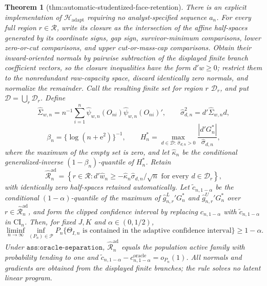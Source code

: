 \documentclass{article}
\newtheorem{theorem}{Theorem}
\begin{document}
\begin{theorem}[thm:automatic-studentized-face-retention]\label{thm:automatic-studentized-face-retention}
There is an explicit implementation of \(\mathcal H_{\mathrm{adapt}}\) requiring no analyst-specified sequence \(a_n\). For every full region \(r\in\mathcal R\), write its closure as the intersection of the affine half-spaces generated by its coordinate signs, gap sign, survivor-minimum comparisons, lower zero-or-cut comparisons, and upper cut-or-mass-cap comparisons. Obtain their inward-oriented normals by pairwise subtraction of the displayed finite branch coefficient vectors, so the closure inequalities have the form \(d'w\ge0\); restrict them to the nonredundant raw-capacity space, discard identically zero normals, and normalize the remainder. Call the resulting finite set for region \(r\) \(\mathcal D_r\), and put \(\mathcal D=\bigcup_r\mathcal D_r\). Define
\[
 \widehat\Sigma_{w,n}=n^{-1}\sum_{i=1}^n
 \widehat\psi_{w,n}(O_{ni})\widehat\psi_{w,n}(O_{ni})',
 \qquad
 \widehat\sigma_{d,n}^2=d'\widehat\Sigma_{w,n}d,
\]
\[
 \beta_n=\{\log(n+\mathrm e^2)\}^{-1},\qquad
 H_n^*=\max_{d\in\mathcal D:\,\widehat\sigma_{d,n}>0}
 \frac{|d'G_n^*|}{\widehat\sigma_{d,n}},
\]
where the maximum of the empty set is zero, and let \(\widehat\kappa_n\) be the conditional generalized-inverse \((1-\beta_n)\)-quantile of \(H_n^*\). Retain
\[
 \widehat{\mathcal R}_n^{\mathrm{ad}}
 =\left\{r\in\mathcal R:
 d'\widehat w_n\ge-\widehat\kappa_n\widehat\sigma_{d,n}/\sqrt n
 \text{ for every }d\in\mathcal D_r\right\},
\]
with identically zero half-spaces retained automatically. Let \(\widetilde c_{n,1-\alpha}\) be the conditional \((1-\alpha)\)-quantile of the maximum of
\(\widehat g^L_{n,r}{}'G_n^*\) and \(\widehat g^U_{n,r}{}'G_n^*\) over \(r\in\widehat{\mathcal R}_n^{\mathrm{ad}}\), and form the clipped confidence interval by replacing \(c_{n,1-\alpha}\) with \(\widetilde c_{n,1-\alpha}\) in \(\mathrm{CI}_n\). Then, for fixed \(J,K\) and \(\alpha\in(0,1/2)\),
\[
 \liminf_{n\to\infty}\inf_{(P_n)\in\mathcal P}
 P_n\{\Theta_{I,n}\text{ is contained in the adaptive confidence interval}\}
 \ge1-\alpha.
\]
Under \(\texttt{ass:oracle-separation}\), \(\widehat{\mathcal R}_n^{\mathrm{ad}}\) equals the population active family with probability tending to one and
\(\widetilde c_{n,1-\alpha}-c^{\mathrm{oracle}}_{n,1-\alpha}=o_{P_n}(1)\). All normals and gradients are obtained from the displayed finite branches; the rule solves no latent linear program.
\end{theorem}
\end{document}
